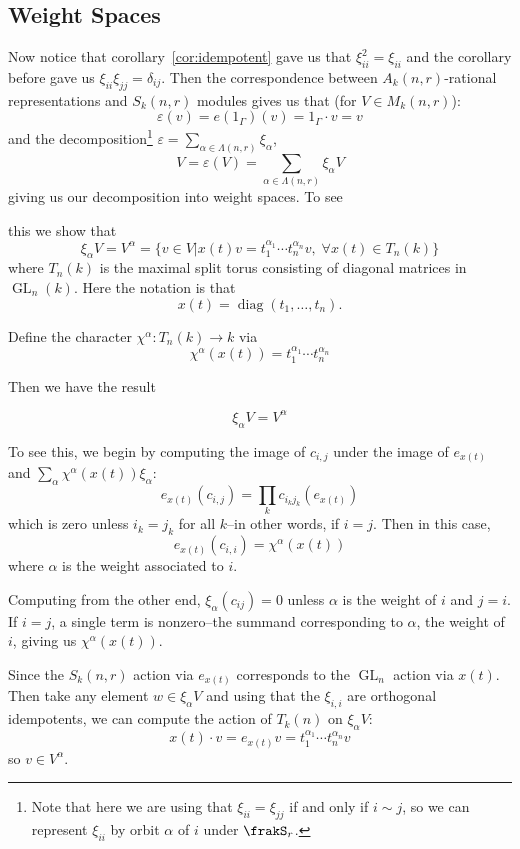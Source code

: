 \documentclass[12pt]{article}
\DeclareMathOperator{\1}{\mathbbm{1}}
\DeclareMathOperator{\GL}{GL}
\begin{document}
\subsection{Weight Spaces}
Now notice that corollary~\ref{cor:idempotent} gave us that $\xi_{ii}^2=\xi_{ii}$ and the corollary before gave us $\xi_{ii}\xi_{jj}=\delta_{ij}$. Then the correspondence between $A_k(n,r)$-rational 
representations and $S_k(n,r)$ modules gives us that (for $V\in M_k(n,r)$):
\[\varepsilon(v)=e(1_\Gamma)(v)=1_\Gamma\cdot v=v\]
and the decomposition\footnote{Note that here we are using that $\xi_{ii}=\xi_{jj}$ if and only if $i\sim j$, so we can represent $\xi_{ii}$ 
by orbit $\alpha$ of $i$ under $\frakS_r$.} $\varepsilon=\sum_{\alpha\in\Lambda(n,r)}\xi_\alpha$,
\[V=\varepsilon(V)=\sum_{\alpha\in\Lambda(n,r)}\xi_{\alpha}V\]
giving us our decomposition into weight spaces. To see{ this we show that 
\[\xi_\alpha V= V^\alpha=\{v\in V|x(t)v=t_1^{\alpha_1}\cdots t_n^{\alpha_n}v,\; \forall x(t)\in T_n(k)\}\]
where $T_n(k)$ is the maximal split torus consisting of diagonal matrices in $\GL_n(k)$. Here the notation is that 
\[x(t)=\operatorname{diag}(t_1,\dots,t_n).\]
\begin{rmk}
	Define the character $\chi^\alpha:T_n(k)\to k$ via 
	\[\chi^\alpha(x(t))=t_1^{\alpha_1}\cdots t_n^{\alpha_n}\]
\end{rmk}
Then we have the result 
\begin{prop}
	\[\xi_\alpha V= V^\alpha\]
\end{prop}
\begin{prf}
	To see this, we begin by computing the image of $c_{i,j}$ under the image of $e_{x(t)}$ and $\sum_{\alpha}\chi^\alpha(x(t))\xi_\alpha$:
	\[e_{x(t)}(c_{i,j})=\prod_k c_{i_kj_k}(e_{x(t)})\]
	which is zero unless $i_k=j_k$ for all $k$--in other words, if $i=j$. Then in this case, 
	\[e_{x(t)}(c_{i,i})=\chi^\alpha(x(t))\]
	where $\alpha$ is the weight associated to $i$.

	Computing from the other end, $\xi_\alpha(c_{ij})=0$ unless $\alpha$ is the weight of $i$ and 
	$j=i$. If $i=j$, a single term is nonzero--the summand corresponding to $\alpha$, the weight of $i$, giving us $\chi^\alpha(x(t))$.

	Since the $S_k(n,r)$ action via $e_{x(t)}$ corresponds to the $\GL_n$ action via $x(t)$. Then take any element $w\in\xi_\alpha V$ and using that the 
	$\xi_{i,i}$ are orthogonal idempotents, we can compute the action of $T_k(n)$ on $\xi_\alpha V$:
	\[x(t)\cdot v=e_{x(t)}v=t_1^{\alpha_1}\cdots t_n^{\alpha_n} v\]
	so $v\in V^\alpha$.


\end{prf}}
\end{document}

